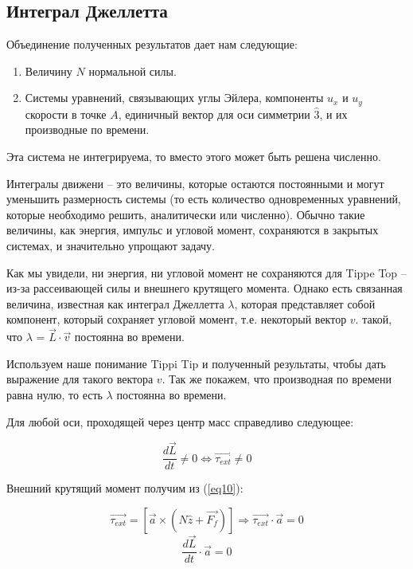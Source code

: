 \documentclass[a4paper,11.5pt]{article} %
\begin{document}
\subsection{Интеграл Джеллетта}

Объединение полученных результатов дает нам следующие:
\begin{enumerate}
	\item Величину $N$ нормальной силы.
	\item Системы уравнений, связывающих углы Эйлера, компоненты $u_x$ и $u_y$ скорости 	в точке $A$, единичный вектор для оси симметрии $\hat{3}$, и их производные по 			времени.
\end{enumerate}

Эта система не интегрируема, то вместо этого может быть решена численно. 

Интегралы движени -- это величины, которые остаются постоянными и могут уменьшить размерность системы (то есть количество одновременных уравнений, которые необходимо решить, аналитически или численно). Обычно такие величины, как энергия, импульс и угловой момент, сохраняются в закрытых системах, и значительно упрощают задачу.

Как мы увидели, ни энергия, ни угловой момент не сохраняются для Tippe Top --  из-за рассеивающей силы и внешнего крутящего момента. Однако есть
связанная величина, известная как интеграл Джеллетта $\lambda$, которая представляет собой компонент, который сохраняет угловой момент, т.е. некоторый вектор $v$. такой, что $\lambda$ = $\vec{L}\cdot \vec{v}$ постоянна во времени.

Используем наше понимание Tippi Tip и полученный результаты, чтобы дать выражение для такого вектора $v$. Так же покажем, что производная по времени равна нулю, то есть $\lambda$ постоянна во времени.

Для любой оси, проходящей через центр масс справедливо следующее:

\begin{equation}
	\frac{d\vec{L}}{dt} \neq 0 \Leftrightarrow \overrightarrow{\tau_{ext}} \neq 0
	\label{eq27}
\end{equation}

Внешний крутящий момент получим из (\ref{eq10}):

\begin{equation}
	\overrightarrow{\tau_{ext}} = \left[\vec{a} \times (N\hat{z} + \vec{F_f})\right] \Rightarrow \overrightarrow{\tau_{ext}}\cdot \vec{a} = 0
	\label{eq28}
\end{equation}
\begin{equation}
	\frac{d\vec{L}}{dt}\cdot \vec{a} = 0
	\label{eq29}
\end{equation}
\end{document}
